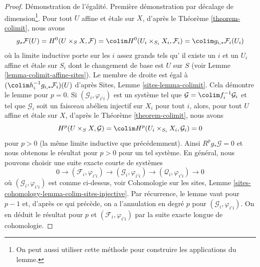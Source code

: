 \begin{proof}
\medskip\noindent
D\'emonstration de l'\'egalit\'e. Premi\`ere d\'emonstration par
d\'ecalage de dimension\footnote{On peut aussi utiliser cette m\'ethode
pour construire les applications du lemme.}. Pour tout
$U$ affine et \'etale sur $X$, d'apr\`es le Th\'eor\`eme \ref{theorem-colimit},
nous avons
$$
g_*\mathcal{F}(U) =
H^0(U \times_S X, \mathcal{F}) =
\colim H^0(U_i \times_{S_i} X_i, \mathcal{F}_i) =
\colim g_{i, *}\mathcal{F}_i(U_i)
$$
o\`u la limite inductive porte sur les $i$ assez grands tels qu'
il existe un $i$ et un $U_i$ affine et \'etale sur $S_i$
dont le changement de base est $U$ sur $S$ (voir
Lemme \ref{lemma-colimit-affine-sites}).
Le membre de droite est \'egal \`a
$(\colim h_i^{-1}g_{i, *}\mathcal{F}_i)(U)$ d'apr\`es
Sites, Lemme \ref{sites-lemma-colimit}.
Cela d\'emontre le lemme pour $p = 0$.
Si $(\mathcal{G}_i, \varphi_{i'i})$ est un syst\`eme tel que
$\mathcal{G} = \colim f_i^{-1}\mathcal{G}_i$
et tel que $\mathcal{G}_i$ soit un faisceau ab\'elien injectif sur $X_i$
pour tout $i$, alors, pour tout $U$ affine et \'etale sur $X$, d'apr\`es
le Th\'eor\`eme \ref{theorem-colimit}, nous avons
$$
H^p(U \times_S X, \mathcal{G}) =
\colim H^p(U_i \times_{S_i} X_i, \mathcal{G}_i) = 0
$$
pour $p > 0$ (la m\^eme limite inductive que pr\'ec\'edemment). Ainsi $R^pg_*\mathcal{G} = 0$
et nous obtenons le r\'esultat pour $p > 0$ pour un tel syst\`eme.
En g\'en\'eral, nous pouvons choisir une suite exacte courte de syst\`emes
$$
0 \to (\mathcal{F}_i, \varphi_{i'i}) \to
(\mathcal{G}_i, \varphi_{i'i}) \to
(\mathcal{Q}_i, \varphi_{i'i}) \to 0
$$
o\`u $(\mathcal{G}_i, \varphi_{i'i})$ est comme ci-dessus, voir
Cohomologie sur les sites, Lemme
\ref{sites-cohomology-lemma-colim-sites-injective}.
Par r\'ecurrence, le lemme vaut pour $p - 1$ et, d'apr\`es ce qui pr\'ec\`ede, on a
l'annulation en degr\'e $p$ pour $(\mathcal{G}_i, \varphi_{i'i})$.
On en d\'eduit le r\'esultat pour $p$
et $(\mathcal{F}_i, \varphi_{i'i})$ par la suite exacte longue
de cohomologie.


\end{proof}
